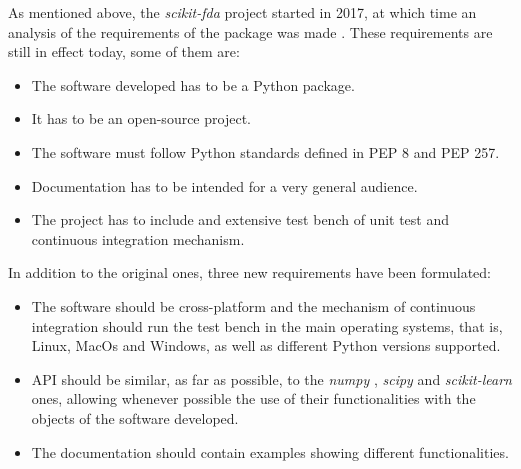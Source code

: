 
As mentioned above, the \textit{scikit-fda} project started in 2017, at which time an
analysis of the requirements of the package was made \cite{FDA2018}. These
requirements are still in effect today, some of them are:

\begin{itemize}
\item The software developed has to be a Python package.
\item It has to be an open-source project.
\item The software must follow Python standards defined in PEP 8 and PEP 257.
\item Documentation has to be intended for a very general audience.
\item The project has to include and extensive test bench of unit test and continuous integration mechanism.
\end{itemize}
In addition to the original ones, three new requirements have been formulated:

\begin{itemize}
\item The software should be cross-platform and the mechanism of
 continuous integration should run the test bench in the main operating systems, that is, 
 Linux, MacOs and Windows, as well as different Python versions supported.
 
\item  API should be similar, as far as possible, to the \textit{numpy}\cite{numpy} , \textit{scipy} and
 \textit{scikit-learn} ones, allowing whenever possible the use of their functionalities with the
  objects of the software developed.
\item The documentation should contain examples showing different functionalities.
\end{itemize}
